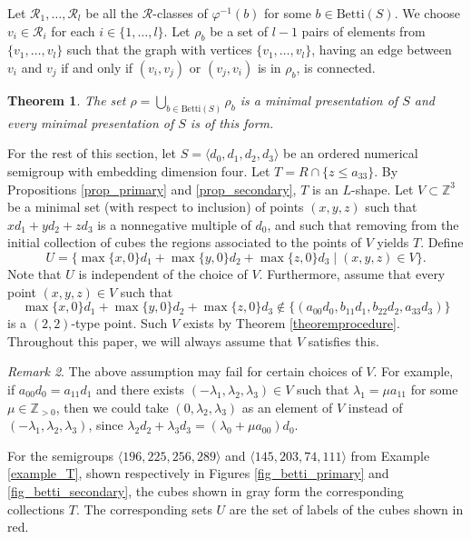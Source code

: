 \documentclass[12pt]{article}
\newtheorem{thm}{Theorem}[section]
\theoremstyle{remark}
\newtheorem{remark}[thm]{Remark}
\begin{document}
Let $\mathcal{R}_1, \dots, \mathcal{R}_l$ be all the $\mathcal{R}$-classes of $\varphi^{-1}(b)$ for some $b \in \text{Betti}(S)$. We choose $v_i \in \mathcal{R}_i$ for each $i \in \{1,\dots,l\}$. Let $\rho_b$ be a set of $l-1$ pairs of elements from $\{v_1, \dots, v_l\}$ such that the graph with vertices $\{v_1, \dots, v_l\}$, having an edge between $v_i$ and $v_j$ if and only if $(v_i,v_j)$ or $(v_j,v_i)$ is in $\rho_b$, is connected. 
\begin{thm}\label{theorem_minimalpresentation}
    \textup{\cite{Rosales1996MinimalRelation}}
    The set $\rho = \bigcup_{b \in \text{Betti}(S)} \rho_b$ is a minimal presentation of $S$ and every minimal presentation of $S$ is of this form.
\end{thm}





For the rest of this section, let $S = \langle d_0,d_1,d_2,d_3 \rangle$ be an ordered numerical semigroup with embedding dimension four. Let $T = R \cap \{z \leq a_{33}\}$. By Propositions \ref{prop_primary} and \ref{prop_secondary}, $T$ is an $L$-shape.
Let $V \subset \mathbb{Z}^3$ be a minimal set (with respect to inclusion) of points $(x,y,z)$ such that $xd_1 + yd_2 +zd_3$ is a nonnegative multiple of $d_0$, and such that removing from the initial collection of cubes the regions associated to the points of $V$ yields $T$. 
Define
$$ U = \{ \max\{ x,0\} d_1 + \max\{y,0\}d_2 + \max\{z,0\}d_3 \mid (x,y,z) \in V \}.$$
Note that $U$ is independent of the choice of $V$. Furthermore, assume that every point $(x,y,z) \in V$ such that
$$ \max\{ x,0\} d_1 + \max\{y,0\}d_2 + \max\{z,0\}d_3 \notin \{(a_{00}d_0,b_{11}d_1,b_{22}d_2,a_{33}d_3)\}$$
is a $(2,2)$-type point. Such $V$ exists by Theorem \ref{theoremprocedure}. Throughout this paper, we will always assume that $V$ satisfies this.

\begin{remark}
   The above assumption may fail for certain choices of $V$. For example, if $a_{00}d_0 = a_{11}d_1$ and there exists $(-\lambda_1,\lambda_2,\lambda_3) \in V$ such that $\lambda_1 = \mu a_{11}$ for some $\mu \in \mathbb{Z}_{>0}$, then we could take $(0,\lambda_2,\lambda_3)$ as an element of $V$ instead of $(-\lambda_1,\lambda_2,\lambda_3)$, since $\lambda_2d_2 + \lambda_3d_3 = (\lambda_0 + \mu a_{00})d_0$.
\end{remark}

For the semigroups $\langle 196,225,256,289 \rangle$ and $\langle 145,203,74,111 \rangle$ from Example \ref{example_T}, shown respectively in Figures \ref{fig_betti_primary} and \ref{fig_betti_secondary}, the cubes shown in gray form the corresponding collections $T$. The corresponding sets $U$ are the set of labels of the cubes shown in red.
\end{document}
